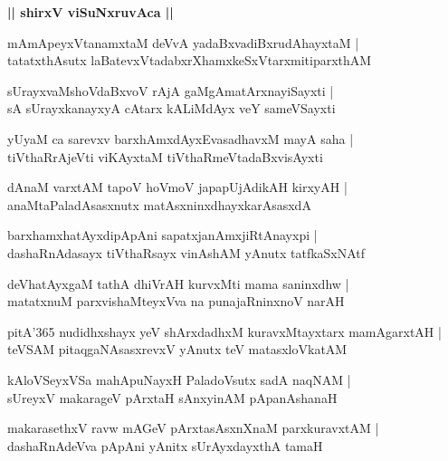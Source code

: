 \documentclass[twoside,12pt,openright]{book}
\newcounter{shloka}[chapter]
\def\uvaca#1{\centerline{{\large\textbf{#1}}}}
\begin{document}
\uvaca{|| shirxV viSuNxruvAca ||}

\begin{shloka}%
mAmApeyxVtanamxtaM deVvA yadaBxvadiBxrudAhayxtaM |\\
tatatxthAsutx laBatevxVtadabxrXhamxkeSxVtarxmitiparxthAM 
\end{shloka}

\begin{shloka}%
sUrayxvaMshoVdaBxvoV rAjA gaMgAmatArxnayiSayxti |\\
sA sUrayxkanayxyA cAtarx kALiMdAyx veY sameVSayxti
\end{shloka}

\begin{shloka}%
yUyaM ca sarevxv barxhAmxdAyxEvasadhavxM mayA saha |\\
tiVthaRrAjeVti viKAyxtaM tiVthaRmeVtadaBxvisAyxti 
\end{shloka}

\begin{shloka}%
dAnaM varxtAM tapoV hoVmoV japapUjAdikAH kirxyAH |\\
anaMtaPaladAsasxnutx matAsxninxdhayxkarAsasxdA 
\end{shloka}

\begin{shloka}%
barxhamxhatAyxdipApAni sapatxjanAmxjiRtAnayxpi |\\
dashaRnAdasayx tiVthaRsayx vinAshAM yAnutx tatfkaSxNAtf
\end{shloka}

\begin{shloka}%
deVhatAyxgaM tathA dhiVrAH kurvxMti mama saninxdhw |\\
matatxnuM parxvishaMteyxVva na punajaRninxnoV narAH
\end{shloka}

\begin{shloka}%
pitA\char'365 nudidhxshayx yeV shArxdadhxM kuravxMtayxtarx mamAgarxtAH |\\
teVSAM pitaqgaNAsasxrevxV yAnutx teV matasxloVkatAM 
\end{shloka}

\begin{shloka}%
kAloVSeyxVSa mahApuNayxH PaladoVsutx sadA naqNAM |\\
sUreyxV makarageV pArxtaH sAnxyinAM pApanAshanaH 
\end{shloka}

\begin{shloka}%
makarasethxV ravw mAGeV pArxtasAsxnXnaM parxkuravxtAM |\\
dashaRnAdeVva pApAni yAnitx sUrAyxdayxthA tamaH 
\end{shloka}
\end{document}
